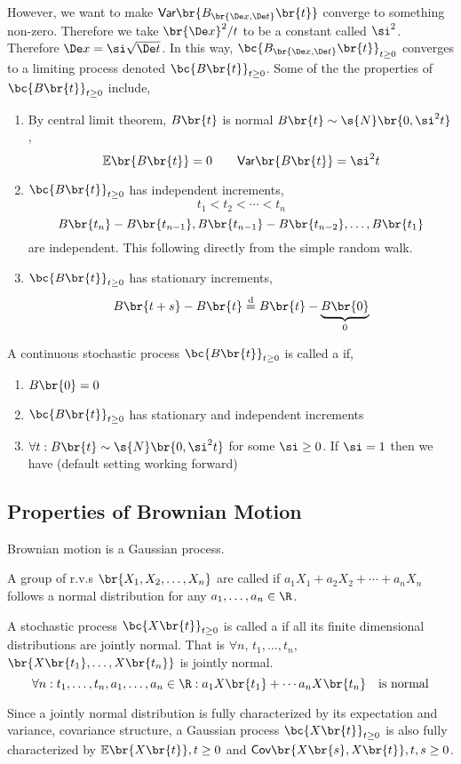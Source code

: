 \documentclass{article}
\newcommand{\Cov}{\textsf{Cov}}
\newcommand{\Var}{\textsf{Var}}
\newcommand{\Exp}{\mathbb{E}}
\begin{document}
    However, we want to make $\Var\br{B_{\br{\De x, \De t}}\br{t}}$ converge to something non-zero. Therefore we take $\br{\De x}^2 / t$ to be a constant called $\si^2$. Therefore $\De x = \si \sqrt{\De t}$. In this way, $\bc{B_{\br{\De x, \De t}}\br{t}}_{t \geq 0}$ converges to a limiting process denoted $\bc{B\br{t}}_{t \geq 0}$. Some of the the properties of $\bc{B\br{t}}_{t \geq 0}$ include,
    \begin{enumerate}
        \item By central limit theorem, $B\br{t}$ is normal $B\br{t} \sim \s{N}\br{0, \si^2 t}$,
        \[ \Exp\br{B\br{t}} = 0 \qquad \Var\br{B\br{t}} = \si^2 t \]
        \item $\bc{B\br{t}}_{t \geq 0}$ has independent increments,
        \[ t_1 < t_2< \cdots < t_n\]
        \[ B\br{t_n} - B\br{t_{n - 1}}, B\br{t_{n-1}} - B\br{t_{n - 2}}, \ldots, B\br{t_1} \]
        are independent. This following directly from the simple random walk.
        \item $\bc{B\br{t}}_{t\geq0}$ has stationary increments,
        \[ B\br{t + s} - B\br{t} \stackrel{\text{d}}{=} B\br{t} - \underbrace{B\br{0}}_{0} \]
    \end{enumerate}
    \begin{definition}
        A continuous stochastic process $\bc{B\br{t}}_{t \geq 0}$ is called a  if,
        \begin{enumerate}
            \item $B\br{0} = 0$
            \item $\bc{B\br{t}}_{t \geq 0}$ has stationary and independent increments
            \item $\forall t: B\br{t} \sim \s{N}\br{0, \si^2 t}$ for some $\si \geq 0$. If $\si = 1$ then we have  (default setting working forward)
        \end{enumerate}
    \end{definition}
    \subsection{Properties of Brownian Motion}
    Brownian motion is a Gaussian process.
    \begin{definition}
        A group of r.v.s $\br{X_1, X_2, \ldots, X_n}$ are called  if $a_1X_1 + a_2 X_2 + \cdots + a_n X_n$ follows a normal distribution for any $a_1, \ldots, a_{n} \in \R$.
    \end{definition}
    \begin{definition}
        A stochastic process $\bc{X\br{t}}_{t \geq 0}$ is called a  if all its finite dimensional distributions are jointly normal. That is $\forall n$, $t_1, \ldots, t_n$, $\br{X\br{t_1}, \ldots, X\br{t_n}}$ is jointly normal.
        \[ \forall n: t_1, \ldots, t_n, a_1, \ldots, a_n \in \R: a_1X\br{t_1} + \cdots a_nX\br{t_n} \quad \text{is normal}\]
    \end{definition}
    Since a jointly normal distribution is fully characterized by its expectation and variance, covariance structure, a Gaussian process $\bc{X\br{t}}_{t \geq 0}$ is also fully characterized by $\Exp\br{X\br{t}}, t \geq 0$ and $\Cov\br{X\br{s}, X\br{t}}, t, s \geq 0$.
\end{document}

